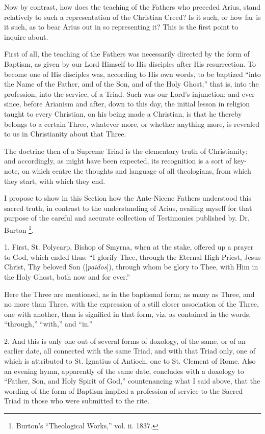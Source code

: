 Now by contrast, how does the teaching of the Fathers who preceded
Arius, stand relatively to such a representation of the Christian
Creed? Is it such, or how far is it such, as to bear Arius out in so
representing it? This is the first point to inquire about.

First of all, the teaching of the Fathers was necessarily directed
by the form of Baptism, as given by our Lord Himself to His disciples
after His resurrection. To become one of His disciples was, according
to His own words, to be baptized ``into the Name of the Father,
and of the Son, and of the Holy Ghost;'' that is, into the
profession, into the service, of a Triad. Such was our Lord's
injunction: and ever since, before Arianism and after, down to this
day, the initial lesson in religion taught to every Christian, on his
being made a Christian, is that he thereby belongs to a certain Three,
whatever more, or whether anything more, is revealed to us in
Christianity about that Three.

The doctrine then of a Supreme Triad is the elementary truth of
Christianity; and accordingly, as might have been expected, its
recognition is a sort of key-note, on which centre the thoughts and
language of all theologians, from which they start, with which they
end.

I propose to show in this Section how the Ante-Nicene Fathers
understood this sacred truth, in contrast to the understanding of
Arius, availing myself for that purpose of the careful and accurate
collection of Testimonies published by. Dr. Burton \footnote{Burton's ``Theological Works,'' vol. ii. 1837.}.

1. First, St. Polycarp, Bishop of Smyrna, when at the stake,
offered up a prayer to God, which ended thus: ``I glorify Thee,
through the Eternal High Priest, Jesus Christ, Thy beloved Son ([\emph{paidos}]),
through whom be glory to Thee, with Him in the Holy Ghost, both now
and for ever.''

Here the Three are mentioned, as in the baptismal form; as many as
Three, and no more than Three, with the expression of a still closer
association of the Three, one with another, than is signified in that
form, viz. as contained in the words, ``through,''
``with,'' and ``in.''

2. And this is only one out of several forms of doxology, of the
same, or of an earlier date, all connected with the same Triad, and
with that Triad only, one of which is attributed to St. Ignatius of
Antioch, one to St. Clement of Rome. Also an evening hymn, apparently
of the same date, concludes with a doxology to ``Father, Son, and
Holy Spirit of God,'' countenancing what I said above, that the
wording of the form of Baptism implied a profession of service
to the Sacred Triad in those who were submitted to the rite.

